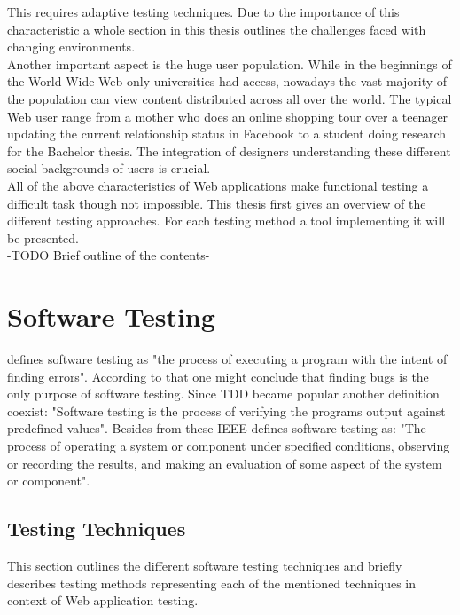 \documentclass[12pt, notitlepage]{article}
\begin{document}
This requires adaptive testing techniques. Due to the importance of this characteristic a whole section in this thesis outlines the challenges faced
with changing environments.\\ 
Another important aspect is the huge user population. While in the beginnings of the World Wide Web only universities had access,
nowadays the vast majority of the population can view content distributed across all over the world. The typical Web user range from a
mother who does an online shopping tour over a teenager updating the current relationship status in Facebook to a student doing research for
the Bachelor thesis. The integration of designers understanding these different social backgrounds of users is crucial.\\


All of the above characteristics of Web applications make functional testing a difficult task though not impossible.
This thesis first gives an overview of the different testing approaches. For each 
testing method a tool implementing it will be presented.\\
-TODO Brief outline of the contents-
\newpage


\section{Software Testing}
\cite{art-of-software-testing} defines software testing as "the process of executing a program with the intent of finding errors".
According to that one might conclude that finding bugs is the only purpose of software testing. Since TDD\cite{tdd} became popular
another definition coexist: "Software testing is the process of verifying the programs output against predefined values". Besides from 
these IEEE\cite{ieee-definition} defines software testing as: "The process of operating a system or component under specified conditions, observing or recording the results, and making an evaluation of some aspect of the system or component".\\
\subsection{Testing Techniques}
This section outlines the different software testing techniques\cite{testing-methods} and briefly describes testing methods representing each of
the mentioned techniques in context of Web application testing.
\end{document}
